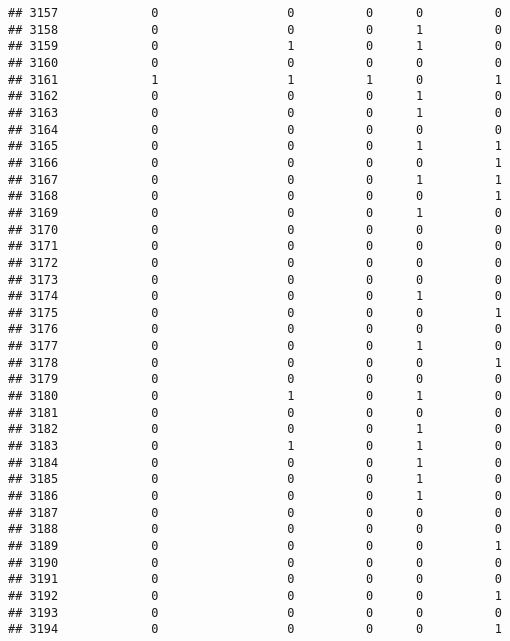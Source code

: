 \documentclass[
]{article}
\begin{document}
\begin{verbatim}
## 3157             0                  0          0      0          0
## 3158             0                  0          0      1          0
## 3159             0                  1          0      1          0
## 3160             0                  0          0      0          0
## 3161             1                  1          1      0          1
## 3162             0                  0          0      1          0
## 3163             0                  0          0      1          0
## 3164             0                  0          0      0          0
## 3165             0                  0          0      1          1
## 3166             0                  0          0      0          1
## 3167             0                  0          0      1          1
## 3168             0                  0          0      0          1
## 3169             0                  0          0      1          0
## 3170             0                  0          0      0          0
## 3171             0                  0          0      0          0
## 3172             0                  0          0      0          0
## 3173             0                  0          0      0          0
## 3174             0                  0          0      1          0
## 3175             0                  0          0      0          1
## 3176             0                  0          0      0          0
## 3177             0                  0          0      1          0
## 3178             0                  0          0      0          1
## 3179             0                  0          0      0          0
## 3180             0                  1          0      1          0
## 3181             0                  0          0      0          0
## 3182             0                  0          0      1          0
## 3183             0                  1          0      1          0
## 3184             0                  0          0      1          0
## 3185             0                  0          0      1          0
## 3186             0                  0          0      1          0
## 3187             0                  0          0      0          0
## 3188             0                  0          0      0          0
## 3189             0                  0          0      0          1
## 3190             0                  0          0      0          0
## 3191             0                  0          0      0          0
## 3192             0                  0          0      0          1
## 3193             0                  0          0      0          0
## 3194             0                  0          0      0          1

\end{verbatim}
\end{document}
